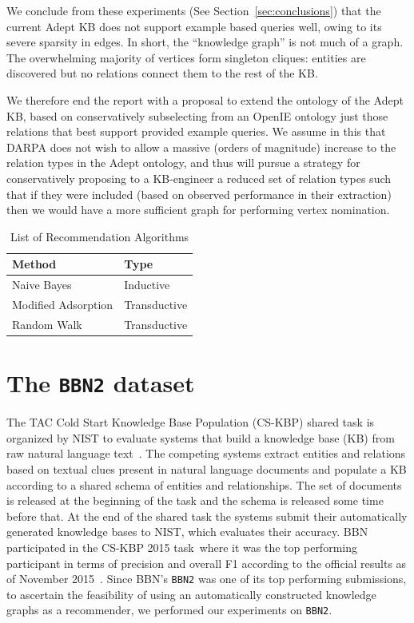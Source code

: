 \documentclass[paper=a4,fontsize=11pt]{scrartcl}
\newcommand{\Secref}[1]{Section~\ref{#1}}
\numberwithin{equation}{section}    %
\numberwithin{figure}{section}      %
\numberwithin{table}{section}       %
\newcommand{\dataset}[0]{\texttt{BBN2} dataset\ }
\newcommand{\task}{CS-KBP 2015 task\ }
\begin{document}
We conclude from these experiments (See \Secref{sec:conclusions})
that the current Adept KB does not
support example based queries well, owing to its severe sparsity
in edges. In short, the ``knowledge graph'' is not much of a graph. The
overwhelming majority of vertices form singleton cliques: entities are
discovered but no relations connect them to the rest of the KB.

We therefore end the report with a proposal to extend the ontology of
the Adept KB, based on conservatively subselecting from an OpenIE
ontology just those relations that best support provided example
queries. We assume in this that DARPA does not wish to allow a
massive (orders of magnitude) increase to the relation types in the
Adept ontology, and thus will pursue a strategy for conservatively
proposing to a KB-engineer a reduced set of relation types such that
if they were included (based on observed performance in their
extraction) then we would have a more sufficient graph for performing
vertex nomination.
\begin{table}[htbp]
  \centering
  \begin{tabular}{l l}
    Method              & Type         \\\hline
    Naive Bayes         & Inductive    \\
    Modified Adsorption & Transductive \\
    Random Walk         & Transductive \\
  \end{tabular}
  \caption{List of Recommendation Algorithms}
  \label{tab:ra}
\end{table}

\section{The \dataset{}}
\label{sec:data}
The TAC Cold Start Knowledge Base Population (CS-KBP) shared task is organized
by NIST to evaluate systems that build a knowledge base (KB) from raw natural
language text~\citep{tac2015cold}. The competing systems extract entities and relations based on
textual clues present in natural language documents and populate a KB according to a shared
schema of entities and relationships. The set of documents is released at the beginning of
the task and the schema is released some time before that.
At the end of the shared task the systems submit their
automatically generated knowledge bases to NIST, which evaluates their accuracy.
BBN participated in the \task where it was the top performing
participant in terms of precision and overall F1 according to the official
results as of November 2015~\citep{bbn2015bonan}. Since BBN's \texttt{BBN2} was one
of its top performing submissions, to ascertain the feasibility of using an
automatically constructed knowledge graphs as a recommender, we
performed our experiments on \texttt{BBN2}.
\end{document}
